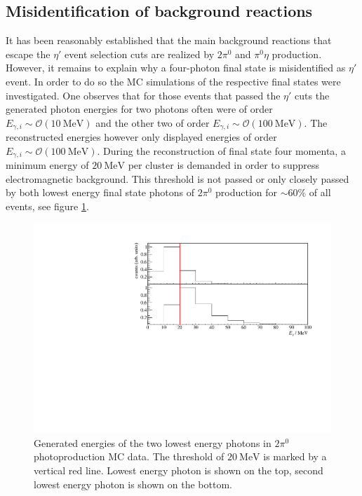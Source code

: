 \subsection{Misidentification of background reactions}
It has been reasonably established that the main background reactions that escape the $\eta'$ event selection cuts are realized by $2\pi^0$ and $\pi^0\eta$ production. However, it remains to explain why a four-photon final state is misidentified as $\eta'$ event. In order to do so the MC simulations of the respective final states were investigated. One observes that for those events that passed the $\eta'$ cuts the generated photon energies for two photons often were of order $E_{\gamma,i} \sim \mathcal{O}(\SI{10}{\mega\eV})$ and the other two of order $E_{\gamma,i} \sim \mathcal{O}(\SI{100}{\mega\eV})$. The reconstructed energies however only displayed energies of order $E_{\gamma,i} \sim \mathcal{O}(\SI{100}{\mega\eV})$.  During the reconstruction of final state four momenta, a minimum energy of $\SI{20}{\mega\eV}$ per cluster is demanded in order to suppress electromagnetic background. This threshold is not passed or only closely passed by both lowest energy final state photons of $2\pi^0$ production for $\sim 60\%$ of all events, see figure \ref{fig:mcgammas_a}.\begin{figure}[htbp]
	\centering
	\includegraphics[width=\linewidth]{../figs/hydrogen/mcgammas.pdf}
	\caption{Generated energies of the two lowest energy photons in $2\pi^0$ photoproduction MC data. The threshold of $\SI{20}{\mega\eV}$ is marked by a vertical red line. Lowest energy photon is shown on the top, second lowest energy photon is shown on the bottom.}
	\label{fig:mcgammas_a}			
\end{figure}

